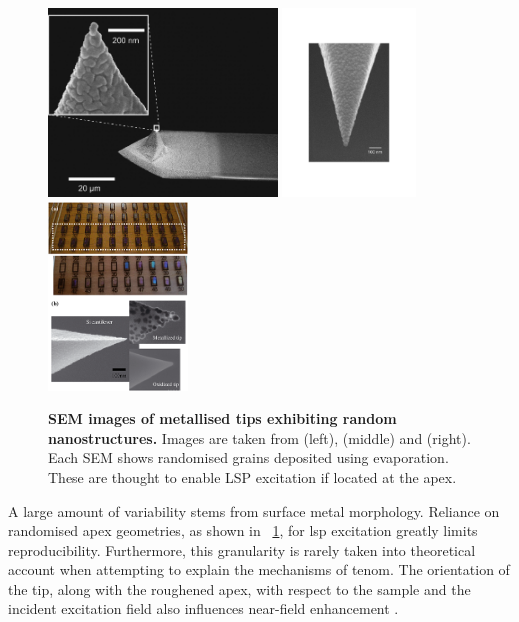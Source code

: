 \documentclass{article}
\begin{document}
\begin{figure}[bt]
\centering
\includegraphics[height=5cm, clip=true, trim=5 75 113 10]{figures/literature/nn-2014-031803_0002}
\includegraphics[height=5cm, clip=true, trim=170 180 140 280]{figures/literature/uetsuki2012supp}
\includegraphics[height=5cm, clip=true, trim=20 5 0 165]{figures/literature/jrs4032-fig-0001}
\caption[]{\textbf{SEM images of metallised tips exhibiting random nanostructures.} Images are taken from \cite{mino2014} (left), \cite{uetsuki2012} (middle) and \cite{hayazawa2012} (right). Each SEM shows randomised grains deposited using evaporation. These are thought to enable LSP excitation if located at the apex.}
\label{fig:metallised_tips}
\end{figure}

A large amount of variability stems from surface metal morphology. Reliance on randomised apex geometries, as shown in \figurename~\ref{fig:metallised_tips}, for \gls{lsp} excitation greatly limits reproducibility. Furthermore, this granularity is rarely taken into theoretical account when attempting to explain the mechanisms of \gls{tenom}. The orientation of the tip, along with the roughened apex, with respect to the sample and the incident excitation field also influences near-field enhancement \cite{yeo2006, mino2014}.
\end{document}
